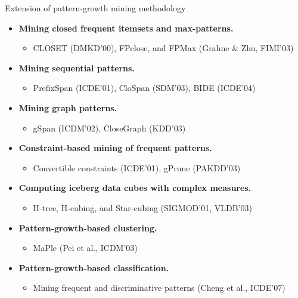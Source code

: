 \documentclass[aspectratio=169,t,xcolor=dvipsnames]{beamer}
\begin{document}
  {
    \begin{frame}{Extension of pattern-growth mining methodology }
    \begin{itemize}
      \item \textbf{Mining closed frequent itemsets and max-patterns.}
      \begin{itemize}
        \item CLOSET (DMKD'00), FPclose, and FPMax (Grahne \& Zhu, FIMI'03)
      \end{itemize}
      \item \textbf{Mining sequential patterns.}
      \begin{itemize}
        \item PrefixSpan (ICDE'01), CloSpan (SDM'03), BIDE (ICDE'04)
      \end{itemize}
      \item \textbf{Mining graph patterns.}
      \begin{itemize}
        \item gSpan (ICDM'02), CloseGraph (KDD'03)
      \end{itemize}
      \item \textbf{Constraint-based mining of frequent patterns.}
      \begin{itemize}
        \item Convertible constraints (ICDE'01), gPrune (PAKDD'03)
      \end{itemize}
      \item \textbf{Computing iceberg data cubes with complex measures.}
      \begin{itemize}
        \item H-tree, H-cubing, and Star-cubing (SIGMOD'01, VLDB'03)
      \end{itemize}
      \item \textbf{Pattern-growth-based clustering.}
      \begin{itemize}
        \item MaPle (Pei et al., ICDM'03)
      \end{itemize}
      \item \textbf{Pattern-growth-based classification.}
      \begin{itemize}
        \item Mining frequent and discriminative patterns (Cheng et al., ICDE'07)
      \end{itemize}
    \end{itemize}
    \end{frame}
  }
\end{document}

